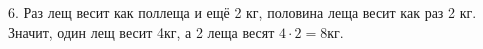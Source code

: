 6. Раз лещ весит как поллеща и ещё 2 кг, половина леща весит как раз 2 кг. Значит, один лещ весит 4кг, а 2 леща весят $4\cdot2=8$кг.\\
